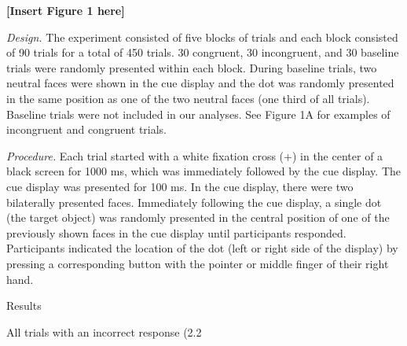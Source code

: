 \documentclass{article}
\begin{document}
	\textbf{[Insert Figure 1 here]}



	\emph{Design. }The experiment consisted of five blocks of trials and each block consisted of 90 trials for a total of 450 trials. 30 congruent, 30 incongruent, and 30 baseline trials were randomly presented within each block. During baseline trials, two neutral faces were shown in the cue display and the dot was randomly presented in the same position as one of the two neutral faces (one third of all trials). Baseline trials were not included in our analyses. See Figure 1A for examples of incongruent and congruent trials.



	\emph{Procedure. }Each trial started with a white fixation cross (+) in the center of a black screen for 1000 ms, which was immediately followed by the cue display. The cue display was presented for 100 ms. In the cue display, there were two bilaterally presented faces. Immediately following the cue display, a single dot (the target object) was randomly presented in the central position of one of the previously shown faces in the cue display until participants responded. Participants indicated the location of the dot (left or right side of the display) by pressing a corresponding button with the pointer or middle finger of their right hand.



	Results



	All trials with an incorrect response (2.2%
\end{document}
